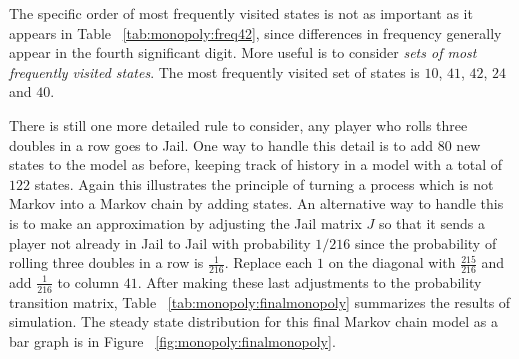 \documentclass[12pt]{article}
\begin{document}
The specific order of most frequently visited states is not as important
as it appears in Table~%
\ref{tab:monopoly:freq42}, since differences in frequency generally
appear in the fourth significant digit.  More useful is to consider
\emph{sets of most frequently visited states}.  The most frequently
visited set of states is \( 10 \), \( 41 \), \( 42 \), \( 24 \) and \(
40 \).

There is still one more detailed rule to consider, any player who rolls
three doubles in a row goes to Jail.  One way to handle this detail is
to add \( 80 \) new states to the model as before, keeping track of
history in a model with a total of \( 122 \) states.  Again this
illustrates the principle of turning a process which is not Markov into
a Markov chain by adding states.  An alternative way to handle this is
to make an approximation by adjusting the Jail matrix \( J \) so that it
sends a player not already in Jail to Jail with probability \( 1/216 \)
since the probability of rolling three doubles in a row is \( \frac{1}{216}
\).  Replace each \( 1 \) on the diagonal with \( \frac{215}{216} \) and
add \( \frac{1}{216} \) to column \( 41 \).  After making these last
adjustments to the probability transition matrix, Table~%
\ref{tab:monopoly:finalmonopoly} summarizes the results of simulation.
The steady state distribution for this final Markov chain model as a bar
graph is in Figure~%
\ref{fig:monopoly:finalmonopoly}.
\end{document}
